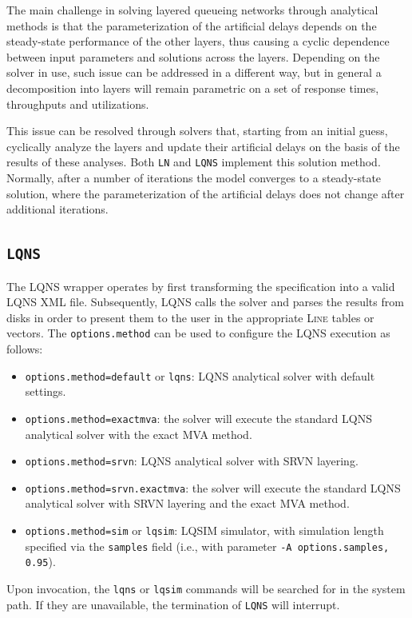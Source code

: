 The main challenge in solving layered queueing networks through analytical methods is that the parameterization of the artificial delays depends on the steady-state performance of the other layers, thus causing a cyclic dependence between input parameters and solutions across the layers. Depending on the solver in use, such issue can be addressed in a different way, but in general a decomposition into layers will remain parametric on a set of response times, throughputs and utilizations.

This issue can be resolved through solvers that, starting from an initial guess, cyclically analyze the layers and update their artificial delays on the basis of the results of these analyses. Both \texttt{LN} and \texttt{LQNS} implement this solution method. Normally, after a number of iterations the model converges to a steady-state solution, where the parameterization of the artificial delays does not change after additional iterations.

\subsection{\texttt{LQNS}}
The LQNS wrapper operates by first transforming the specification into a valid LQNS XML file. Subsequently, LQNS calls the solver and parses the results from disks in order to present them to the user in the appropriate \textsc{Line} tables or vectors. The \texttt{options.method} can be used to configure the LQNS execution as follows:
\begin{itemize}
\item \texttt{options.method=default} or \texttt{lqns}: LQNS analytical solver with default settings.
\item \texttt{options.method=exactmva}: the solver will execute the standard LQNS analytical solver with the exact MVA method.
\item \texttt{options.method=srvn}: LQNS analytical solver with SRVN layering.
\item \texttt{options.method=srvn.exactmva}: the solver will execute the standard LQNS analytical solver with SRVN layering and  the exact MVA method.
\item \texttt{options.method=sim} or \texttt{lqsim}: LQSIM simulator, with simulation length specified via the \texttt{samples} field (i.e., with parameter \texttt{-A options.samples, 0.95}).
\end{itemize}
Upon invocation, the \texttt{lqns} or \texttt{lqsim} commands will be searched for in the system path. If they are unavailable, the termination of \texttt{LQNS} will interrupt.

